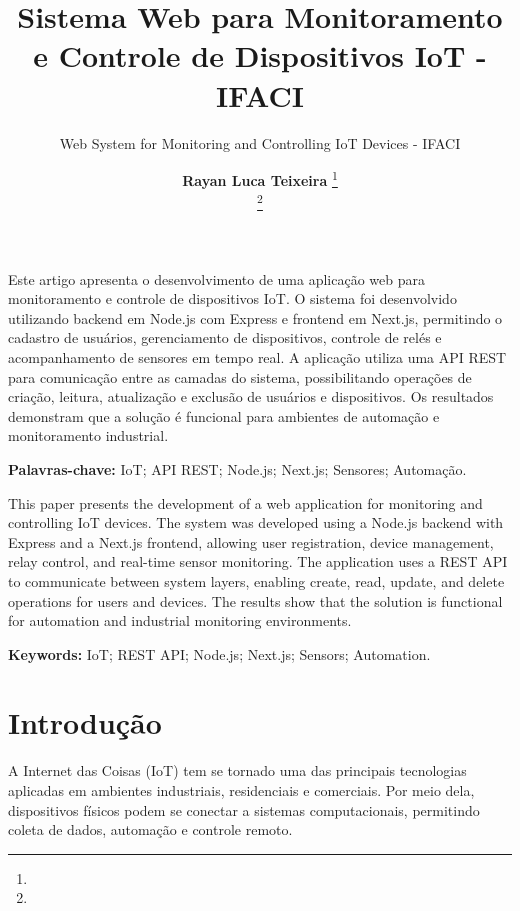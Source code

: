 \documentclass[12pt]{unisenaiclass}
\title{Sistema Web para Monitoramento e Controle de Dispositivos IoT - IFACI}
\subtitle{Web System for Monitoring and Controlling IoT Devices - IFACI}
\author{
    \textbf{Rayan Luca Teixeira} \thanks{}\\
    \textbf{} \thanks{}
}
\begin{document}
\maketitle

\begin{resumo}
Este artigo apresenta o desenvolvimento de uma aplicação web para monitoramento e controle de dispositivos IoT. O sistema foi desenvolvido utilizando backend em Node.js com Express e frontend em Next.js, permitindo o cadastro de usuários, gerenciamento de dispositivos, controle de relés e acompanhamento de sensores em tempo real. A aplicação utiliza uma API REST para comunicação entre as camadas do sistema, possibilitando operações de criação, leitura, atualização e exclusão de usuários e dispositivos. Os resultados demonstram que a solução é funcional para ambientes de automação e monitoramento industrial.
\end{resumo}

\begin{justify}
    \textbf{Palavras-chave:} IoT; API REST; Node.js; Next.js; Sensores; Automação.
\end{justify}

\begin{abstract1}
This paper presents the development of a web application for monitoring and controlling IoT devices. The system was developed using a Node.js backend with Express and a Next.js frontend, allowing user registration, device management, relay control, and real-time sensor monitoring. The application uses a REST API to communicate between system layers, enabling create, read, update, and delete operations for users and devices. The results show that the solution is functional for automation and industrial monitoring environments.
\end{abstract1}

\begin{justify}
    \textbf{Keywords:} IoT; REST API; Node.js; Next.js; Sensors; Automation.
\end{justify}

\section{Introdução}

A Internet das Coisas (IoT) tem se tornado uma das principais tecnologias aplicadas em ambientes industriais, residenciais e comerciais. Por meio dela, dispositivos físicos podem se conectar a sistemas computacionais, permitindo coleta de dados, automação e controle remoto.
\end{document}

